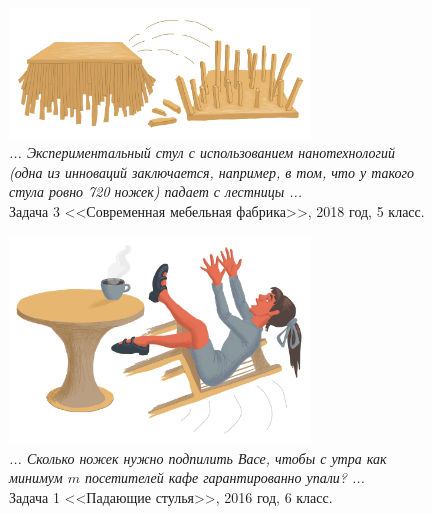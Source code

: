 \documentclass[10pt]{scrbook} \usepackage{modules/nonstahp_book}
\begin{document}
\begin{figure} \begin{center}
	\includegraphics[width=8cm]{figures/color/01c}
	\caption{
             {\itshape ... Экспериментальный стул с использованием нанотехнологий 
             (одна из инноваций заключается, например, в том, что у 
             такого стула ровно 720 ножек) падает с лестницы ...}\\
             {Задача 3 <<Современная мебельная фабрика>>, 2018 год, 5 класс.}}
\end{center} \end{figure}

\begin{figure} \begin{center}
	\includegraphics[width=8cm]{figures/color/05c}
	\caption{
             {\itshape ... Сколько ножек нужно подпилить Васе, 
              чтобы с утра как минимум $m$ посетителей кафе гарантированно упали? ...}\\
             {Задача 1 <<Падающие стулья>>, 2016 год, 6 класс.}}
\end{center} \end{figure}
\end{document}
